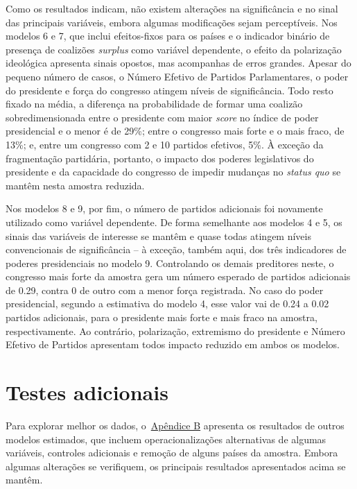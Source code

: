 Como os resultados indicam, não existem alterações na significância e no sinal das principais variáveis, embora algumas modificações sejam perceptíveis. Nos modelos 6 e 7, que inclui efeitos-fixos para os países e o indicador binário de presença de coalizões \textit{surplus} como variável dependente, o efeito da polarização ideológica apresenta sinais opostos, mas acompanhas de erros grandes. Apesar do pequeno número de casos, o Número Efetivo de Partidos Parlamentares, o poder do presidente e força do congresso atingem níveis de significância. Todo resto fixado na média, a diferença na probabilidade de formar uma coalizão sobredimensionada entre o presidente com maior \textit{score} no índice de poder presidencial e o menor é de 29\%; entre o congresso mais forte e o mais fraco, de 13\%; e, entre um congresso com 2 e 10 partidos efetivos, 5\%. À exceção da fragmentação partidária, portanto, o impacto dos poderes legislativos do presidente e da capacidade do congresso de impedir mudanças no \textit{status quo} se mantêm nesta amostra reduzida.
 
Nos modelos 8 e 9, por fim, o número de partidos adicionais foi novamente utilizado como variável dependente. De forma semelhante aos modelos 4 e 5, os sinais das variáveis de interesse se mantêm e quase todas atingem níveis convencionais de significância -- à exceção, também aqui, dos três indicadores de poderes presidenciais no modelo 9. Controlando os demais preditores neste, o congresso mais forte da amostra gera um número esperado de partidos adicionais de 0.29, contra 0 de outro com a menor força registrada. No caso do poder presidencial, segundo a estimativa do modelo 4, esse valor vai de 0.24 a 0.02 partidos adicionais, para o presidente mais forte e mais fraco na amostra, respectivamente. Ao contrário, polarização, extremismo do presidente e Número Efetivo de Partidos apresentam todos impacto reduzido em ambos os modelos.

\FloatBarrier
\section{Testes adicionais}

Para explorar melhor os dados, o~\hyperref[chap:robustez]{Apêndice B} apresenta os resultados de outros modelos estimados, que incluem operacionalizações alternativas de algumas variáveis, controles adicionais e remoção de alguns países da amostra. Embora algumas alterações se verifiquem, os principais resultados apresentados acima se mantêm.